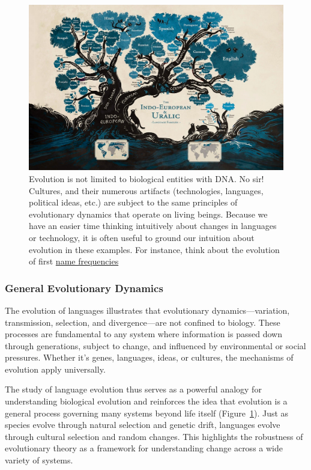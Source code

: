 \documentclass[10pt,a4paper]{scrbook}
\begin{document}
\begin{figure}
    \centering
    \includegraphics[width=0.75\linewidth]{image.png}
    \caption{Evolution is not limited to biological entities with DNA. No sir! Cultures, and their numerous artifacts (technologies, languages, political ideas, etc.) are subject to the same principles of evolutionary dynamics that operate on living beings. Because we have an easier time thinking intuitively about changes in languages or technology, it is often useful to ground our intuition about evolution in these examples. For instance, think about the evolution of first \href{https://www.pnas.org/doi/abs/10.1073/pnas.1507143112}{name frequencies}}
    \label{fig:LangTree}
\end{figure}

\subsubsection{General Evolutionary Dynamics}

The evolution of languages illustrates that evolutionary dynamics—variation, transmission, selection, and divergence—are not confined to biology. These processes are fundamental to any system where information is passed down through generations, subject to change, and influenced by environmental or social pressures. Whether it's genes, languages, ideas, or cultures, the mechanisms of evolution apply universally.

The study of language evolution thus serves as a powerful analogy for understanding biological evolution and reinforces the idea that evolution is a general process governing many systems beyond life itself (Figure~\ref{fig:LangTree}). Just as species evolve through natural selection and genetic drift, languages evolve through cultural selection and random changes. This highlights the robustness of evolutionary theory as a framework for understanding change across a wide variety of systems.
\end{document}
